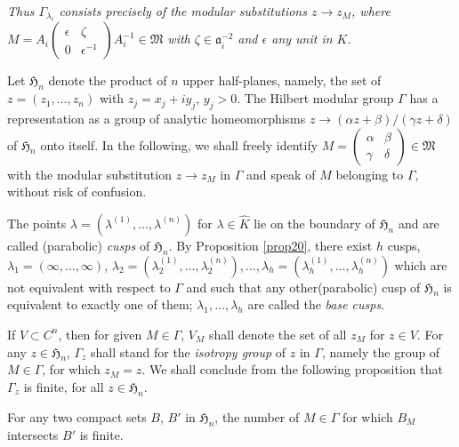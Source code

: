 {\em Thus $\Gamma_{\lambda_{i}}$ consists precisely of the modular
  substitutions $z\to z_{M}$, where $M=A_{i}\left(\begin{smallmatrix}
    \epsilon & \zeta\\ 0 &
    \epsilon^{-1}  \end{smallmatrix}\right)A^{-1}_{i}\in\mathfrak{M}$
  with $\zeta\in \mathfrak{a}^{-2}_{i}$ and $\epsilon$ any unit in
  $K$.}

Let $\mathfrak{H}_{n}$ denote the product of $n$ upper half-planes,
namely, the set of $z=(z_{1},\ldots,z_{n})$ with $z_{j}=x_{j}+iy_{j}$,
$y_{j}>0$. The Hilbert modular group $\Gamma$ has a representation as
a group of analytic homeomorphisms $z\to (\alpha z+\beta)/(\gamma
z+\delta)$ of $\mathfrak{H}_{n}$ onto itself. In the following, we
shall freely identify $M=\left(\begin{smallmatrix} \alpha &
  \beta\\ \gamma & \delta\end{smallmatrix}\right)\in \mathfrak{M}$
  with the modular substitution $z\to z_{M}$ in $\Gamma$ and speak of
  $M$ belonging to $\Gamma$, without risk of confusion.

The points $\lambda=(\lambda^{(1)},\ldots,\lambda^{(n)})$ for
$\lambda\in\hat{K}$ lie on the boundary of $\mathfrak{H}_{n}$ and
are called (parabolic) {\em cusps} of $\mathfrak{H}_{n}$. By
Proposition \ref{prop20}, there exist $h$ cusps,
$\lambda_{1}=(\infty,\ldots,\infty)$,
$\lambda_{2}=(\lambda^{(1)}_{2},\ldots,\lambda^{(n)}_{2}),\ldots,\lambda_{h}=(\lambda^{(1)}_{h},\ldots,\lambda^{(n)}_{h})$
which are not equivalent with respect to $\Gamma$ and such that any
other\break (parabolic) cusp of $\mathfrak{H}_{n}$ is equivalent to exactly
one of them; $\lambda_{1},\ldots,\lambda_{h}$ are called the {\em base
  cusps}.


If $V\subset C^{n}$, then for given $M\in\Gamma$, $V_{M}$ shall denote
the set of all $z_{M}$ for $z\in V$. For any $z\in \mathfrak{H}_{n}$,
$\Gamma_{z}$ shall stand for the {\em isotropy group} of $z$ in
$\Gamma$, namely the group of $M\in \Gamma$, for which $z_{M}=z$. We
shall conclude from the following proposition that $\Gamma_{z}$ is
finite, for all $z\in \mathfrak{H}_{n}$.

\begin{proposition}\label{prop21}
For any two compact sets $B$, $B'$ in $\mathfrak{H}_{n}$, the number
of $M\in \Gamma$ for which $B_{M}$ intersects $B'$ is finite.
\end{proposition}

